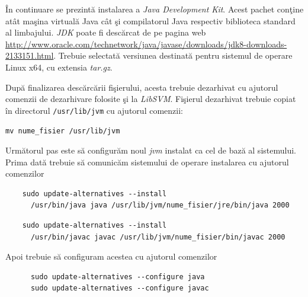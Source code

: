 \documentclass[a4paper,12pt]{report}
\begin{document}
  \par
  \^In continuare se prezint\u a instalarea a \textit{Java Development Kit}. Acest pachet con\c tine at\^at 
  ma\c sina virtual\u a Java c\^at \c si compilatorul Java respectiv biblioteca standard al limbajului.
  \textit{JDK} poate fi desc\u arcat de pe pagina web 
  \href{http://www.oracle.com/technetwork/java/javase/downloads/jdk8-downloads-2133151.html}
  {http://www.oracle.com/technetwork/java/javase/downloads/jdk8-downloads-2133151.html}.
  Trebuie selectat\u a versiunea destinat\u a pentru sistemul de operare Linux x64, cu extensia 
  \textit{tar.gz}. 
  
  \par
  Dup\u a finalizarea desc\u arc\u arii fi\c sierului, acesta trebuie dezarhivat cu ajutorul comenzii de dezarhivare 
  folosite \c si la \textit{LibSVM}. Fi\c sierul dezarhivat trebuie copiat \^in directorul 
  \verb|/usr/lib/jvm| cu ajutorul comenzii:
  
  \begin{center}
    \verb|mv nume_fisier /usr/lib/jvm|
  \end{center}
  
  \par
  Urm\u atorul pas este s\u a configur\u am noul \textit{jvm} instalat ca cel de baz\u a al sistemului.
  Prima dat\u a trebuie s\u a comunic\u am sistemului de operare instalarea cu ajutorul comenzilor
  
  \begin{center}
    \begin{verbatim}
	sudo update-alternatives --install 
	  /usr/bin/java java /usr/lib/jvm/nume_fisier/jre/bin/java 2000
    \end{verbatim}

    \begin{verbatim}
	sudo update-alternatives --install 
	  /usr/bin/javac javac /usr/lib/jvm/nume_fisier/bin/javac 2000
    \end{verbatim}
  \end{center}
  
  \par
  Apoi trebuie s\u a configuram acestea cu ajutorul comenzilor
  
  \begin{center}
    \begin{verbatim}
      sudo update-alternatives --configure java
      sudo update-alternatives --configure javac
    \end{verbatim}
  \end{center}
  
\end{document}
